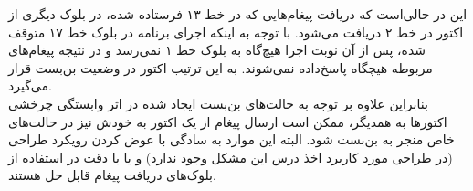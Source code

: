  این در حالی‌است که دریافت پیغام‌هایی که در خط ۱۳ فرستاده شده، در بلوک دیگری از اکتور در خط ۲ دریافت می‌شود. با توجه به اینکه اجرای برنامه در بلوک خط ۱۷ متوقف شده،‌ پس از آن نوبت اجرا هیچ‌گاه به بلوک خط ۱ نمی‌رسد و در نتیجه پیغام‌های مربوطه هیچگاه پاسخ‌داده نمی‌شوند. به این ترتیب اکتور در وضعیت بن‌بست قرار می‌گیرد.\\
  بنابراین علاوه بر توجه به حالت‌های بن‌بست ایجاد شده در اثر وابستگی چرخشی اکتورها به همدیگر، ممکن است ارسال پیغام از یک اکتور به خودش نیز در حالت‌های خاص منجر به بن‌بست شود. البته این موارد به سادگی با عوض کردن رویکرد طراحی (در طراحی مورد کاربرد اخذ درس این مشکل وجود ندارد) و یا با دقت در استفاده از بلوک‌های دریافت پیغام قابل حل هستند.
